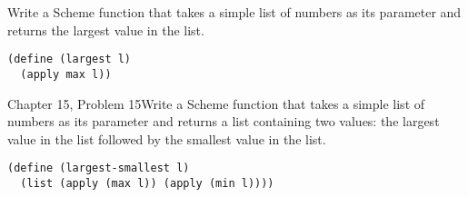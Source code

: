 \documentclass[11pt]{article}
\begin{document}
\begin{ps}
\begin{problemcit}{}Write a Scheme function that takes a simple list of numbers as its parameter and returns the largest value in the list.\end{problemcit}
\begin{soln}
\begin{verbatim}
(define (largest l)
  (apply max l))
\end{verbatim}
\end{soln}
\end{ps}

\begin{ps}
\begin{problemcit}{Chapter 15, Problem 15}Write a Scheme function that takes a simple list of numbers as its parameter and returns a list containing two values: the largest value in the list followed by the smallest value in the list.\end{problemcit}
\begin{soln}
\begin{verbatim}
(define (largest-smallest l)
  (list (apply (max l)) (apply (min l))))
\end{verbatim}
\end{soln}
\end{ps}
\end{document}
